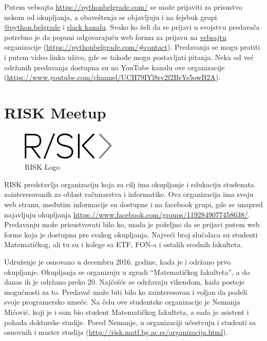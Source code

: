 \documentclass[a4paper]{article}
\begin{document}
{Putem vebsajta \url{https://pythonbelgrade.com/} se može prijaviti za prisustvo nekom od okupljanja, a obaveštenja se objavljuju i na fejsbuk grupi \href{https://www.facebook.com/python.belgrade/}{@python.belgrade} i \href{https://pythonbelgrade.slack.com/join/shared_invite/enQtNTM0OTI4NzY3NDI2LTk2OThkNjQ2YmM5NWNkNTBjMjU3NDY0NjcyNDFiYmZmNjQ4MDE3NjczYWM0NTk1YWVlYzlhNGIwYjU3NjA3Y2Y}{slack kanalu}. Svako ko želi da se prijavi u svojstvu predavača potrebno je da popuni odgovarajuću web formu za prijavu na \href{https://pythonbelgrade.com/}{vebsajtu} organizacije (\url{https://pythonbelgrade.com/#contact}). Predavanja se mogu pratiti i putem video linka uživo, gde se takođe mogu postavljati pitanja. Neka od već održanih predavanja dostupna su na YouTube kanalu ove organizacije (\url{https://www.youtube.com/channel/UCH79IYl8rv2f2BrYs5owB2A}).


\section{RISK Meetup}
\label{sec:riskmatf}

\begin{figure}[h!]
  \centering
  \includegraphics[width=0.4\textwidth]{riskmatf.png}
  \caption{RISK Logo}
\end{figure}

RISK predstavlja organizaciju koja za cilj ima okupljanje i edukaciju studenata zainteresovanih za oblast računarstva i informatike. \cite{aboutRisk}
Ova organizacija ima svoju web stranu, međutim informacije su dostupne i na facebook grupi, gde se unapred najavljuju okupljanja \url{https://www.facebook.com/groups/1192849077458638/}. Predavanju može prisustvovati bilo ko, mada je poželjno da se prijavi putem web forme koja je dostupna pre svakog okupljanja. Najveći broj slučalaca su
studenti Matematičkog, ali tu su i kolege sa ETF, FON-a i ostalih srodnih fakulteta.

Udruženje je osnovano u decembru 2016. godine, kada je i održano prvo okupljanje. Okupljanja se organizuju u zgradi ``Matematičkog fakulteta'', a do danas ih je održano preko 20. Najčešće se održavaju vikendom, kada postoje mogućnosti za to. Predavač može biti bilo ko zainteresovan i voljan da podeli svoje programersko umeće. Na čelu ove studentske organizacije je Nemanja Mićović, koji je i sam bio student Matematičkog fakulteta, a sada je asistent i pohađa doktorske studije. Pored Nemanje, u organizaciji učestvuju i studenti sa osnovnih i master studija (\url{http://risk.matf.bg.ac.rs/organizacija.html}).

}
\end{document}

